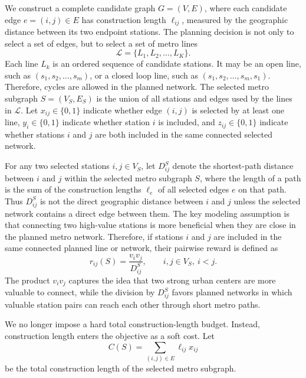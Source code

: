 \documentclass[9pt,a4paper,twocolumn,twoside]{tau-class/tau}
\begin{document}
    We construct a complete candidate graph $G=(V,E)$, where each candidate edge $e=(i,j) \in E$ has construction length $\ell_{ij}$, measured by the geographic distance between its two endpoint stations. The planning decision is not only to select a set of edges, but to select a set of metro lines
    \begin{equation}
        \mathcal{L}=\{L_1,L_2,\ldots,L_K\}.
    \end{equation}
    Each line $L_k$ is an ordered sequence of candidate stations. It may be an open line, such as $(s_1,s_2,\ldots,s_m)$, or a closed loop line, such as $(s_1,s_2,\ldots,s_m,s_1)$. Therefore, cycles are allowed in the planned network. The selected metro subgraph $S=(V_S,E_S)$ is the union of all stations and edges used by the lines in $\mathcal{L}$. Let $x_{ij} \in \{0,1\}$ indicate whether edge $(i,j)$ is selected by at least one line, $y_i \in \{0,1\}$ indicate whether station $i$ is included, and $z_{ij} \in \{0,1\}$ indicate whether stations $i$ and $j$ are both included in the same connected selected network.

    For any two selected stations $i,j \in V_S$, let $D^S_{ij}$ denote the shortest-path distance between $i$ and $j$ within the selected metro subgraph $S$, where the length of a path is the sum of the construction lengths $\ell_e$ of all selected edges $e$ on that path. Thus $D^S_{ij}$ is not the direct geographic distance between $i$ and $j$ unless the selected network contains a direct edge between them. The key modeling assumption is that connecting two high-value stations is more beneficial when they are close in the planned metro network. Therefore, if stations $i$ and $j$ are included in the same connected planned line or network, their pairwise reward is defined as
    \begin{equation}
        r_{ij}(S) = \frac{v_i v_j}{D^S_{ij}}, \qquad i,j \in V_S,\ i<j .
    \end{equation}
    The product $v_i v_j$ captures the idea that two strong urban centers are more valuable to connect, while the division by $D^S_{ij}$ favors planned networks in which valuable station pairs can reach each other through short metro paths.

    We no longer impose a hard total construction-length budget. Instead, construction length enters the objective as a soft cost. Let
    \begin{equation}
        C(S)=\sum_{(i,j)\in E} \ell_{ij}x_{ij}
    \end{equation}
    be the total construction length of the selected metro subgraph.
\end{document}
